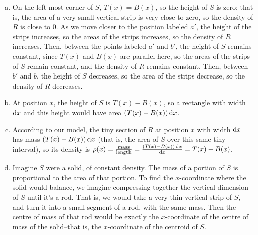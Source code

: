 \begin{solution}
\begin{enumerate}[(a)]
\item
On the left-most corner of $S$, $T(x)=B(x)$, so the height of $S$ is zero; that is, the area of a very small vertical strip is very close to zero, so the density of $R$ is close to 0. As we move closer to the position labeled $a'$, the height of the strips increases, so the areas of the strips increases, so the density of $R$ increases. Then, between the points labeled $a'$ and $b'$, the height of $S$ remains constant, since $T(x)$ and $B(x)$ are parallel here, so the areas of the strips of $S$ remain constant, and the density of $R$ remains constant. Then, between $b'$ and $b$, the height of $S$ decreases, so the area of the strips decrease, so the density of $R$ decreases.
\begin{center}
\end{center}
\item At position $x$, the height of $S$ is $T(x)-B(x)$, so a rectangle with width $\mathrm{d}x$ and this height would have area $(T(x)-B(x))\,\mathrm{d}x$.
\item According to our model, the tiny section of $R$ at position $x$ with width $\mathrm{d}x$ has mass $(T(x)-B(x))\,\mathrm{d}x$ (that is, the area of $S$ over this same tiny interval), so its density is $\rho(x) = \frac{\text{mass}}{\text{length}} = \frac{(T(x)-B(x))\,\mathrm{d}x}{\mathrm{d}x} = T(x)-B(x)$.
\item
Imagine $S$ were a solid, of constant density. The mass of a portion of $S$ is proportional to the area of that portion. To find the $x$-coordinate where the solid would balance, we imagine compressing together the vertical dimension of $S$ until it's a rod. That is, we would take a very thin vertical strip of $S$, and turn it into a small segment of a rod, with the same mass. Then the centre of mass of that rod would be exactly the $x$-coordinate of the centre of mass of the solid--that is, the $x$-coordinate of the centroid of $S$.


\end{enumerate}
\end{solution}
